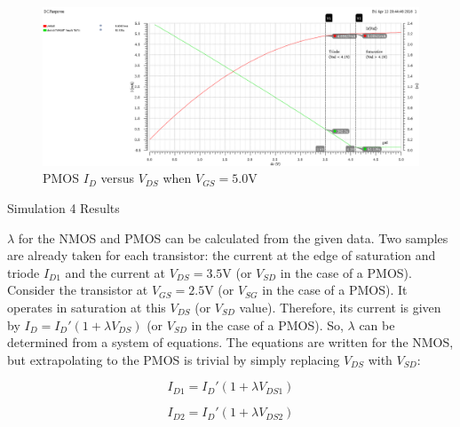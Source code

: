\FloatBarrier

\FloatBarrier

\begin{figure}[h!]
	\centering
	\includegraphics[scale=0.75]{../images/id_vs_vds_vgs_is_5_pmos.PNG}
	\caption{PMOS $I_{D}$ versus $V_{DS}$ when $V_{GS} = 5.0$\si{\volt}}
	\label{fig:id_vs_vds_vgs_is_5_pmos}
\end{figure}

\FloatBarrier

\FloatBarrier

\begin{table}[h!]
	\centering
	\caption{Simulation 4 Results}
	\label{tab:sim4_results}
\end{table}

\FloatBarrier

$\lambda$ for the NMOS and PMOS can be calculated from the given data.
Two samples are already taken for each transistor: the current at the edge of saturation and triode $I_{D1}$ and the current at $V_{DS} = 3.5$\si{\volt} (or $V_{SD}$ in the case of a PMOS).
Consider the transistor at $V_{GS} = 2.5$\si{\volt} (or $V_{SG}$ in the case of a PMOS).
It operates in saturation at this $V_{DS}$ (or $V_{SD}$ value).
Therefore, its current is given by $I_{D} = I_{D}' ( 1 + \lambda V_{DS} )$ (or $V_{SD}$ in the case of a PMOS).
So, $\lambda$ can be determined from a system of equations.
The equations are written for the NMOS, but extrapolating to the PMOS is trivial by simply replacing $V_{DS}$ with $V_{SD}$:

\begin{equation}
	\label{eq:lambda_eqn_1}
	I_{D1} = I_{D}' ( 1 + \lambda V_{DS1} )
\end{equation}

\begin{equation}
	\label{eq:lambda_eqn_2}
	I_{D2} = I_{D}' ( 1 + \lambda V_{DS2} )
\end{equation}

